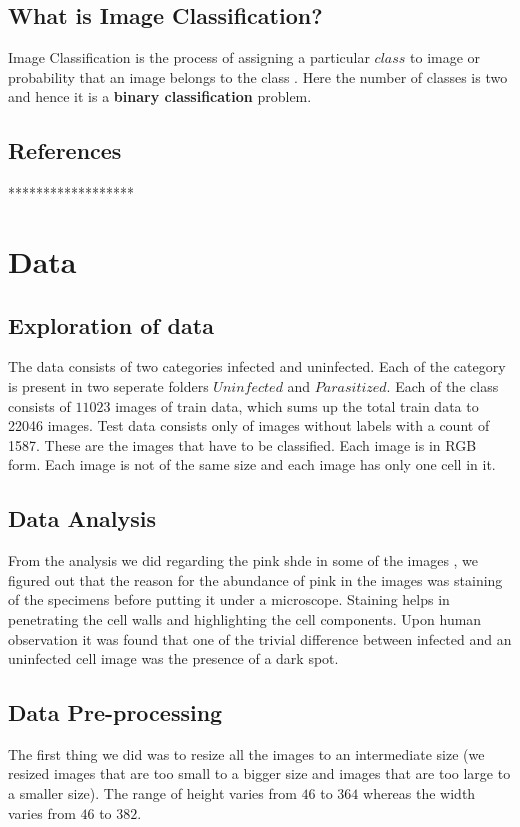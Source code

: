 \documentclass{scrreprt}
\begin{document}
\section{What is Image Classification?}
Image Classification is the process of assigning a particular $class$ to image or probability that an image belongs to the class . Here the number of classes is two and hence it is a \textbf{binary classification} problem. 

\section{References}
{******************}





\chapter{Data}

\section{Exploration of data}
The data consists of two categories infected and uninfected. Each of the category is present in two seperate folders $Uninfected$ and $Parasitized$. Each of the class consists of $11023$ images of train data, which sums up the total train data to 22046 images. Test data consists only of images without labels with a count of 1587. These are the images that have to be classified. Each image is in RGB form. Each image is not of the same size and each image has only one cell in it. 

\section{Data Analysis}
From the analysis we did regarding the pink shde in some of the images , we figured out that the reason for the abundance of pink in the images was staining of the specimens before putting it under a microscope. Staining helps in penetrating the cell walls and highlighting the cell components. Upon human observation it was found that one of the trivial difference between infected and an uninfected cell image was the presence of a dark spot.



\section{Data Pre-processing}
The first thing we did was to resize all the images to an intermediate size (we resized images that are too small to a bigger size and images that are too large to a smaller size). 
The range of height varies from $46$ to $364$ whereas the width varies from $46$ to $382$.
\end{document}
